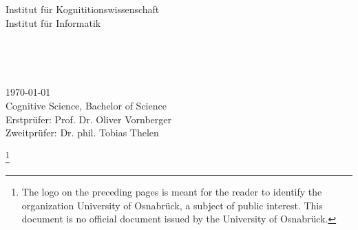 \begin{titlepage}
\begin{addmargin}[-1cm]{-3cm}
\begin{center}
      Institut für Kognititionswissenschaft \\ \medskip
      Institut für Informatik

      \vfill

      \Large
       \\
      \bigskip

      \begingroup
        \LARGE
        \color{uos_red} \\
        \bigskip
      \endgroup

      \Large

      \vfill
      \vfill
    \end{center}

    \today \\
    Cognitive Science, Bachelor of Science \\
    Erstprüfer: Prof. Dr. Oliver Vornberger \\
    Zweitprüfer: Dr. phil. Tobias Thelen \\
  \end{addmargin}
  \clearpage

  \thispagestyle{empty}
  \newcommand\blfootnote[1]{
    \begingroup
    \renewcommand\thefootnote{}\footnote{#1}
    \addtocounter{footnote}{-1}
    \endgroup
  }
  \blfootnote{The logo on the preceding pages is meant for the reader to identify the organization University of Osnabrück, a subject of public interest. This document is no official document issued by the University of Osnabrück.}
  \cleardoublepage
\end{titlepage}
